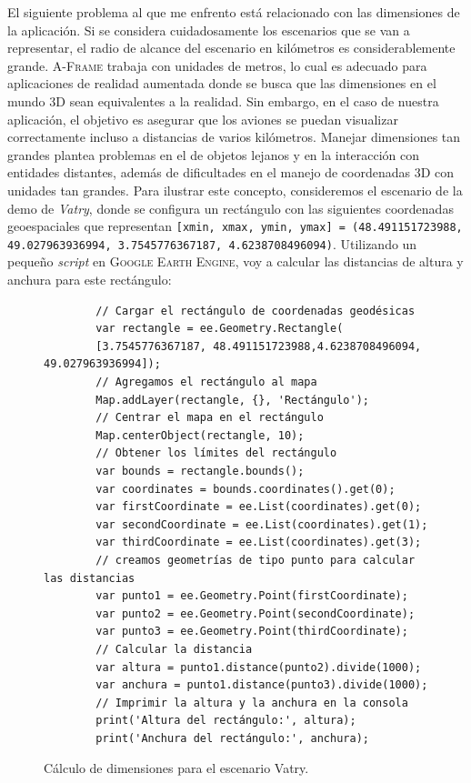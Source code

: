 \documentclass[a4paper, 11pt]{book}
\begin{document}
El siguiente problema al que me enfrento está relacionado con las dimensiones de la aplicación. Si se considera cuidadosamente los escenarios que se van a representar, el radio de alcance del escenario en kilómetros es considerablemente grande. \textsc{A-Frame} trabaja con unidades de metros, lo cual es adecuado para aplicaciones de realidad aumentada donde se busca que las dimensiones en el mundo 3D sean equivalentes a la realidad. Sin embargo, en el caso de nuestra aplicación, el objetivo es asegurar que los aviones se puedan visualizar correctamente incluso a distancias de varios kilómetros. Manejar dimensiones tan grandes plantea problemas en el  de objetos lejanos y en la interacción con entidades distantes, además de dificultades en el manejo de coordenadas 3D con unidades tan grandes.
Para ilustrar este concepto, consideremos el escenario de la demo de \emph{Vatry}, donde se configura un rectángulo con las siguientes coordenadas geoespaciales que representan \texttt{[xmin, xmax, ymin, ymax] = (48.491151723988, 49.027963936994, 3.7545776367187, 4.6238708496094)}. Utilizando un pequeño \emph{script} en \textsc{Google Earth Engine}, voy a calcular las distancias de altura y anchura para este rectángulo:
\begin{figure}[H]
	\centering
	\begin{verbatim}
		// Cargar el rectángulo de coordenadas geodésicas
		var rectangle = ee.Geometry.Rectangle(
		[3.7545776367187, 48.491151723988,4.6238708496094, 49.027963936994]);
		// Agregamos el rectángulo al mapa
		Map.addLayer(rectangle, {}, 'Rectángulo');
		// Centrar el mapa en el rectángulo
		Map.centerObject(rectangle, 10);
		// Obtener los límites del rectángulo
		var bounds = rectangle.bounds();
		var coordinates = bounds.coordinates().get(0);
		var firstCoordinate = ee.List(coordinates).get(0);
		var secondCoordinate = ee.List(coordinates).get(1);
		var thirdCoordinate = ee.List(coordinates).get(3);
		// creamos geometrías de tipo punto para calcular las distancias
		var punto1 = ee.Geometry.Point(firstCoordinate);
		var punto2 = ee.Geometry.Point(secondCoordinate);
		var punto3 = ee.Geometry.Point(thirdCoordinate);
		// Calcular la distancia
		var altura = punto1.distance(punto2).divide(1000);
		var anchura = punto1.distance(punto3).divide(1000);
		// Imprimir la altura y la anchura en la consola
		print('Altura del rectángulo:', altura);
		print('Anchura del rectángulo:', anchura);
	\end{verbatim}
	\caption{Cálculo de dimensiones para el escenario Vatry.
		\label{codigo:dimensionesVatry}
	}
\end{figure}
\end{document}
